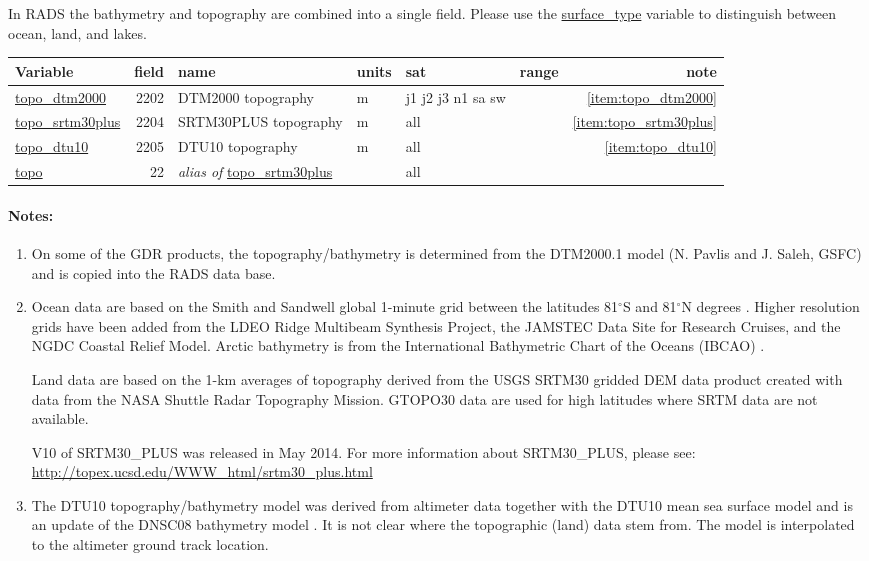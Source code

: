 \documentclass[a4paper,11pt,openany,natbib,nomargin]{thesis}
\makeatletter
\renewcommand\deg{\ensuremath{^\circ}}
\newcommand\var[1]{\url{#1}\index{variables!#1@\protect\url{#1}}}
\newcommand\alias[1]{\emph{alias of} \var{#1}}
\newenvironment{vartable}{
\begin{table}[ht]
\small
\begin{tabular}{lrllllr}
\hline
Variable & field & name & units & sat & range & note \\
\hline
}{
\hline
\end{tabular}
\end{table}
}
\newenvironment{notes}[1][Notes:]{\FloatBarrier\paragraph{#1}\begin{enumerate}}{\end{enumerate}}
\makeatother
\begin{document}
In RADS the bathymetry and topography are combined into a single field. Please use the \var{surface_type} variable to distinguish between ocean, land, and lakes.

\begin{vartable}
\var{topo_dtm2000}    & 2202 & DTM2000 topography    & m & j1 j2 j3 n1 sa sw          & & \ref{item:topo_dtm2000} \\
\var{topo_srtm30plus} & 2204 & SRTM30PLUS topography & m & all & & \ref{item:topo_srtm30plus} \\
\var{topo_dtu10}      & 2205 & DTU10 topography      & m & all & & \ref{item:topo_dtu10} \\
\hline
\var{topo}            & 22 & \alias{topo_srtm30plus} && all && \\
\end{vartable}


\begin{notes}
\item On some of the GDR products, the topography/bathymetry is determined from the DTM2000.1 model (N. Pavlis and J. Saleh, GSFC) and is copied into the RADS data base.\label{item:topo_dtm2000}
\item
Ocean data are based on the Smith and Sandwell global 1-minute grid between the latitudes 81$\deg$S and 81$\deg$N degrees \citep{sandwell2014b}. Higher resolution grids have been added from the LDEO Ridge Multibeam Synthesis Project, the JAMSTEC Data Site for Research Cruises, and the NGDC Coastal Relief Model. Arctic bathymetry is from the International Bathymetric Chart of the Oceans (IBCAO) \citep{jakobsson2012}.

Land data are based on the 1-km averages of topography derived from the USGS SRTM30 gridded DEM data product created with data from the NASA Shuttle Radar Topography Mission. GTOPO30 data are used for high latitudes where SRTM data are not available.

V10 of SRTM30\_PLUS was released in May 2014.
For more information about SRTM30\_PLUS, please see:
\url{http://topex.ucsd.edu/WWW_html/srtm30_plus.html}
\label{item:topo_srtm30plus}
\item The DTU10 topography/bathymetry model was derived from altimeter data together with the DTU10 mean sea surface model \citep{andersen2010} and is an update of the DNSC08 bathymetry model \citep{andersen2009a}. It is not clear where the topographic (land) data stem from. The model is interpolated to the altimeter ground track location.\label{item:topo_dtu10}
\end{notes}
\end{document}

